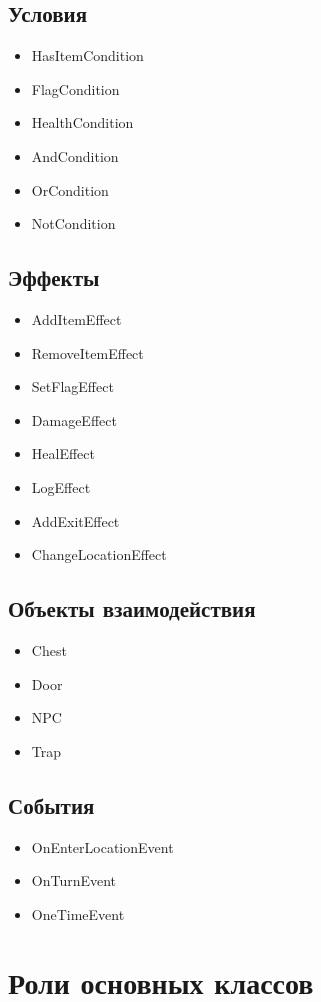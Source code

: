 \documentclass[a4paper,12pt]{article}
\begin{document}
\subsection{Условия}
\begin{itemize}
\item HasItemCondition
\item FlagCondition
\item HealthCondition
\item AndCondition
\item OrCondition
\item NotCondition
\end{itemize}

\subsection{Эффекты}
\begin{itemize}
\item AddItemEffect
\item RemoveItemEffect
\item SetFlagEffect
\item DamageEffect
\item HealEffect
\item LogEffect
\item AddExitEffect
\item ChangeLocationEffect
\end{itemize}

\subsection{Объекты взаимодействия}
\begin{itemize}
\item Chest
\item Door
\item NPC
\item Trap
\end{itemize}

\subsection{События}
\begin{itemize}
\item OnEnterLocationEvent
\item OnTurnEvent
\item OneTimeEvent
\end{itemize}

\section{Роли основных классов}
\end{document}
